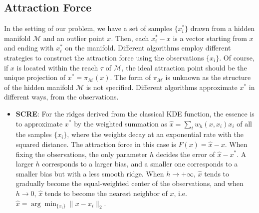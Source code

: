 \documentclass[aos,preprint]{imsart}
\theoremstyle{remark}
\begin{document}
\begin{appendix}
\subsection{Attraction Force}
In the setting of our problem, we have a set of samples $\{x_i^*\}$ drawn from a hidden manifold $\mathcal M$ and an outlier point ${x}$. Then, each $x_i^*-{x}$ is a vector starting from ${x}$ and ending with $x_i^*$ on the manifold. Different algorithms employ different strategies to construct the attraction force using the observations $\{x_i\}$. Of course, if ${x}$ is located within the reach $\tau$ of $\mathcal M$, the ideal attraction point should be the unique projection of $x^*=\pi_{\mathcal M}( x)$. The form of $\pi_{\mathcal M}$ is unknown as the structure of the hidden manifold $\mathcal M$ is not specified. Different algorithms approximate $x^*$ in different ways, from the observations.
\begin{itemize}
\item{\bf SCRE}: For the ridges derived from the classical KDE function, the essence is to approximate $x^*$ by the weighted summation as $\hat{x} = \sum_i w_h({x}, x_i)x_i$ of all the samples $\{x_i\}$, where the weights decay at an exponential rate with the squared distance. The attraction force in this case is $F(x) = \hat{x}-x$. When fixing the observations, the only parameter $h$ decides the error of $\hat{x}-{x}^*$. A larger $h$ corresponds to a larger bias, and a smaller one corresponds to a smaller bias but with a less smooth ridge. When $h\rightarrow +\infty$, $\hat{x}$ tends to gradually become the equal-weighted center of the observations, and when $h\rightarrow 0$, $\hat{x}$ tends to become the nearest neighbor of $x$, i.e. $\hat{x} = \arg\min_{\{x_i\}} \|x-x_i\|_2$.


\end{itemize}
\end{appendix}
\end{document}
